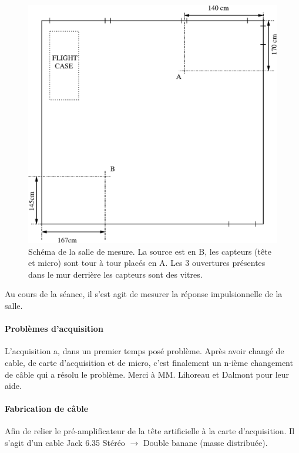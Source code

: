 \documentclass[12pt]{article}
\begin{document}
\begin{figure}[h]
    \vfill\begin{center}
        \includegraphics[scale=0.75]{schema_salle.eps}
    \end{center}\vfill
    \caption{\label{salle} Schéma de la salle de mesure. La source est en B, les capteurs (tête et micro) sont tour à
tour placés en A. Les 3 ouvertures présentes dans le mur derrière les capteurs sont des vitres.}
\end{figure}

Au cours de la séance, il s'est agit de mesurer la réponse impulsionnelle de la salle.

\paragraph{Problèmes d'acquisition}
L'acquisition a, dans un premier temps posé problème.
Après avoir changé de cable, de carte d'acquisition et de micro, c'est finalement un n-ième changement de câble qui a
résolu le problème. Merci à MM. Lihoreau et Dalmont pour leur aide.

\paragraph{Fabrication de câble}
Afin de relier le pré-amplificateur de la tête artificielle à la carte d'acquisition. Il s'agit d'un cable Jack 6.35
Stéréo $\rightarrow$ Double banane (masse distribuée).
\end{document}
